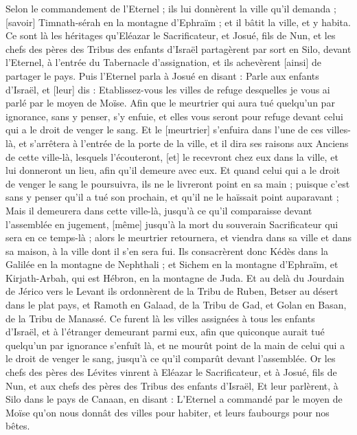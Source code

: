 \begin{multicols}{2}
Selon le commandement de l'Eternel ; ils lui donnèrent la ville qu'il demanda ; [savoir] Timnath-sérah en la montagne d'Ephraïm ; et il bâtit la ville, et y habita.
Ce sont là les héritages qu'Eléazar le Sacrificateur, et Josué, fils de Nun, et les chefs des pères des Tribus des enfants d'Israël partagèrent par sort en Silo, devant l'Eternel, à l'entrée du Tabernacle d'assignation, et ils achevèrent [ainsi] de partager le pays.
\VerseOne{}Puis l'Eternel parla à Josué en disant :
Parle aux enfants d'Israël, et [leur] dis : Etablissez-vous les villes de refuge desquelles je vous ai parlé par le moyen de Moïse.
Afin que le meurtrier qui aura tué quelqu'un par ignorance, sans y penser, s'y enfuie, et elles vous seront pour refuge devant celui qui a le droit de venger le sang.
Et le [meurtrier] s'enfuira dans l'une de ces villes-là, et s'arrêtera à l'entrée de la porte de la ville, et il dira ses raisons aux Anciens de cette ville-là, lesquels l'écouteront, [et] le recevront chez eux dans la ville, et lui donneront un lieu, afin qu'il demeure avec eux.
Et quand celui qui a le droit de venger le sang le poursuivra, ils ne le livreront point en sa main ; puisque c'est sans y penser qu'il a tué son prochain, et qu'il ne le haïssait point auparavant ;
Mais il demeurera dans cette ville-là, jusqu'à ce qu'il comparaisse devant l'assemblée en jugement, [même] jusqu'à la mort du souverain Sacrificateur qui sera en ce temps-là ; alors le meurtrier retournera, et viendra dans sa ville et dans sa maison, à la ville dont il s'en sera fui.
Ils consacrèrent donc Kédès dans la Galilée en la montagne de Nephthali ; et Sichem en la montagne d'Ephraïm, et Kirjath-Arbah, qui est Hébron, en la montagne de Juda.
Et au delà du Jourdain de Jérico vers le Levant ils ordonnèrent de la Tribu de Ruben, Betser au désert dans le plat pays, et Ramoth en Galaad, de la Tribu de Gad, et Golan en Basan, de la Tribu de Manassé.
Ce furent là les villes assignées à tous les enfants d'Israël, et à l'étranger demeurant parmi eux, afin que quiconque aurait tué quelqu'un par ignorance s'enfuît là, et ne mourût point de la main de celui qui a le droit de venger le sang, jusqu'à ce qu'il comparût devant l'assemblée.
\VerseOne{}Or les chefs des pères des Lévites vinrent à Eléazar le Sacrificateur, et à Josué, fils de Nun, et aux chefs des pères des Tribus des enfants d'Israël,
Et leur parlèrent, à Silo dans le pays de Canaan, en disant : L'Eternel a commandé par le moyen de Moïse qu'on nous donnât des villes pour habiter, et leurs faubourgs pour nos bêtes.

\end{multicols}
